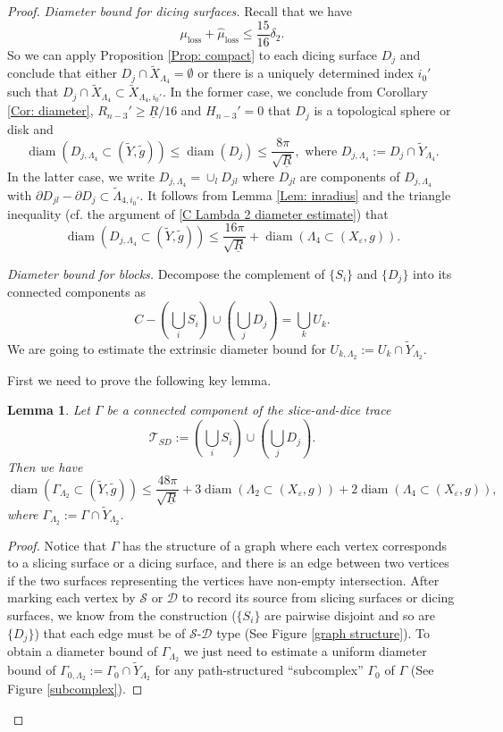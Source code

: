 \documentclass[11pt,letterpaper]{amsart}
\numberwithin{equation}{section}
\newtheorem{lemma}[theorem]{Lemma}
\theoremstyle{definition}
\DeclareMathOperator{\diam}{diam}
\newcommand{\ve}{\varepsilon}
\begin{document}
\begin{proof}
\medskip

{\it Diameter bound for dicing surfaces.} Recall that we have
$$
\mu_{\mathrm{loss}}+\hat \mu_{\mathrm{loss}}\leq \frac{15}{16}\delta_2.
$$
So we can apply Proposition \ref{Prop: compact} to each dicing surface $D_j$  and conclude that either $D_j\cap \tilde X_{\Lambda_4}=\emptyset$ or there is a uniquely determined index $i_0'$ such that $D_j\cap \tilde X_{\Lambda_4}\subset \tilde X_{\Lambda_4,i_0'}$.
In the former case, we conclude from Corollary \ref{Cor: diameter}, $R_{n-3}'\geq \underline R/16$ and $H_{n-3}'=0$ that  $D_j$ is a topological sphere or disk and
$$
\diam(D_{j,\Lambda_4}\subset (\tilde Y,\tilde g))\leq \diam(D_j)\leq \frac{8\pi}{\sqrt{\underline R}},\mbox{ where }D_{j,\Lambda_4}:=D_j\cap \tilde Y_{\Lambda_4}.
$$
In the latter case, we write $D_{j,\Lambda_4}=\cup_l D_{jl}$ where $D_{jl}$ are components of $D_{j,\Lambda_4}$ with $\partial D_{jl}-\partial D_j\subset \tilde \Lambda_{4,i_0'}$. It follows from Lemma \ref{Lem: inradius} and the triangle inequality (cf. the argument of \eqref{C Lambda 2 diameter estimate}) that
$$
\diam(D_{j,\Lambda_4}\subset (\tilde Y,\tilde g))\leq \frac{16\pi}{\sqrt{\underline R}}+\diam(\Lambda_4\subset (X_\ve,g)).
$$

\medskip

{\it Diameter bound for blocks.} Decompose the complement of $\{S_i\}$ and $\{D_j\}$ into its connected components as
$$
C-\left(\bigcup_i S_i\right)\cup\left(\bigcup_j D_j\right)=\bigcup_k U_k.
$$
We are going to estimate the extrinsic diameter bound for $U_{k,\Lambda_2}:=U_k\cap \tilde Y_{\Lambda_2}$.

First we need to prove the following key lemma.
\begin{lemma}\label{Lem: combination diameter}
Let $\Gamma$ be a connected component of the slice-and-dice trace
$$
\mathcal T_{SD}:=\left(\bigcup_i S_i\right)\cup\left(\bigcup_j D_j\right).
$$
Then we have
$$
\diam(\Gamma_{\Lambda_2}\subset (\tilde Y,\tilde g))\leq \frac{48\pi}{\sqrt{\underline R}}+3\diam(\Lambda_2\subset(X_\ve,g))+2\diam(\Lambda_4\subset(X_\ve,g)),
$$
where $\Gamma_{\Lambda_2}:=\Gamma\cap \tilde Y_{\Lambda_2}$.
\end{lemma}
\begin{proof}
Notice that $\Gamma$ has the structure of a graph where each vertex corresponds to a slicing surface or a dicing surface, and there is an edge between two vertices if the two surfaces representing the vertices have non-empty intersection. After marking each vertex by $\mathcal S$ or $\mathcal D$ to record its source from slicing surfaces or dicing surfaces, we know from the construction ($\{S_{i}\}$ are pairwise disjoint and so are $\{D_{j}\}$) that each edge must be of $\mathcal S$-$\mathcal D$ type (See Figure \ref{graph structure}).
To obtain a diameter bound of $\Gamma_{\Lambda_2}$ we just need to estimate a uniform diameter bound of $\Gamma_{0,\Lambda_2}:=\Gamma_0\cap \tilde Y_{\Lambda_2}$ for any path-structured ``subcomplex'' $\Gamma_0$ of $\Gamma$ (See Figure \ref{subcomplex}).


\end{proof}
\end{proof}
\end{document}
